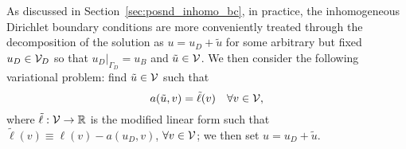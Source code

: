 As discussed in Section~\ref{sec:posnd_inhomo_bc}, in practice, the inhomogeneous Dirichlet boundary conditions are more conveniently treated through the decomposition of the solution as $u = u_D + \tilde u$ for some arbitrary but fixed $u_D \in \mathcal{V}_D$ so that $u_D|_{\Gamma_D} = u_B$ and $\tilde u \in \mathcal{V}$.  We then consider the following variational problem: find $\tilde u \in \mathcal{V}$ such that
\begin{equation*}
  a(\tilde u,v) = \tilde \ell(v) \quad \forall v \in \mathcal{V},
\end{equation*}
where $\tilde \ell: \mathcal{V} \to \mathbb{R}$ is the modified linear form such that $\tilde \ell(v) \equiv \ell(v) - a(u_D,v)$, $\forall v \in \mathcal{V}$; we then set $u = u_D + \tilde u$. 


